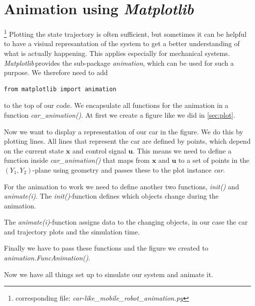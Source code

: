 \documentclass[a4paper,11pt,headings=standardclasses]{scrartcl}%
\newcommand{\mpl}{\emph{Matplotlib}\,}
\begin{document}
\section{Animation using \mpl}
\label{sec:animation}
\footnote{corresponding file: \emph{car-like\_mobile\_robot\_animation.py}}
Plotting the state trajectory is often sufficient, but sometimes it can be helpful to have a visiual represantation of the system to get a better understanding of what is actually happening. This applies especially for mechanical systems.
\mpl provides the sub-package \emph{animation}, which can be used for such a purpose. We therefore need to add 
\begin{lstlisting}
from matplotlib import animation
\end{lstlisting}
to the top of our code. We encapsulate all functions for the animation in a function \emph{car\_animation()}. At first we create a figure like we did in \ref{sec:plot}.

Now we want to display a representation of our car in the figure. We do this by plotting lines. All lines that represent the car are defined by points, which depend on the current state $\mathbf{x}$ and control signal $\mathbf{u}$. This means we need to define a function inside \emph{car\_animation()} that maps from $\mathbf{x}$ and $\mathbf{u}$ to a set of points in the $(Y_1,Y_2)$-plane using geometry and passes these to the plot instance \emph{car}.

For the animation to work we need to define another two functions, \emph{init()} and \emph{animate(i)}. The \emph{init()}-function defines which objects change during the animation.

The \emph{animate(i)}-function assigns data to the changing objects, in our case the car and trajectory plots and the simulation time.

Finally we have to pass these functions and the figure we created to \emph{animation.FuncAnimation()}.

Now we have all things set up to simulate our system and animate it.

\end{document}
